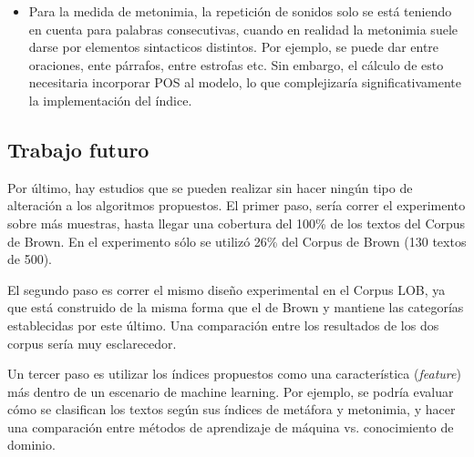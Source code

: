 \documentclass[12pt,letterpaper,twoside]{article}
\begin{document}
\begin{itemize}
\item Para la medida de metonimia, la repetición de sonidos solo se está
teniendo en cuenta para palabras consecutivas, cuando en realidad la
metonimia suele darse por elementos sintacticos distintos. Por
ejemplo, se puede dar entre oraciones, ente párrafos, entre estrofas
etc. Sin embargo, el cálculo de esto necesitaria incorporar POS al
modelo, lo que complejizaría significativamente la implementación
del índice.
\end{itemize}


\subsection{Trabajo futuro}
\label{sec:org153b409}

Por último, hay estudios que se pueden realizar sin hacer ningún
tipo de alteración a los algoritmos propuestos. El primer paso,
sería correr el experimento sobre más muestras, hasta llegar una
cobertura del 100\% de los textos del Corpus de Brown. En el
experimento sólo se utilizó 26\% del Corpus de Brown (130 textos de
500).

El segundo paso es correr el mismo diseño experimental en el
Corpus LOB, ya que está construido de la misma forma que el de
Brown y mantiene las categorías establecidas por este último. Una
comparación entre los resultados de los dos corpus sería muy
esclarecedor.

Un tercer paso es utilizar los índices propuestos como una
característica (\emph{feature}) más dentro de un escenario de machine
learning. Por ejemplo, se podría evaluar cómo se clasifican los
textos según sus índices de metáfora y metonimia, y hacer
una comparación entre métodos de aprendizaje de máquina vs.
conocimiento de dominio. 




 
\nocite{*}
\end{document}

